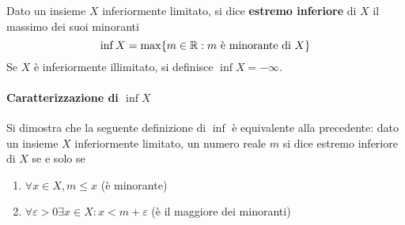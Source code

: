 \begin{boxdef}
    Dato un insieme $X$ inferiormente limitato, si dice \textbf{estremo inferiore} di $X$ il massimo dei suoi minoranti
    \[\inf X = \max\{m\in \mathbb{R} : m \text{ è minorante di }X\}\]
    Se $X$ è inferiormente illimitato, si definisce $\inf X = -\infty$.
\end{boxdef}

\paragraph{Caratterizzazione di $\inf X$}
Si dimostra che la seguente definizione di $\inf$ è equivalente alla precedente: dato un insieme $X$ inferiormente limitato, un numero reale $m$ si dice estremo inferiore di $X$ se e solo se 
\begin{enumerate}[label={\roman*)}]
    \item $\forall x\in X, m\leq x $ (è minorante)
    \item $\forall \varepsilon >0 \exists x\in X: x<m+\varepsilon$ (è il maggiore dei minoranti)
\end{enumerate}
